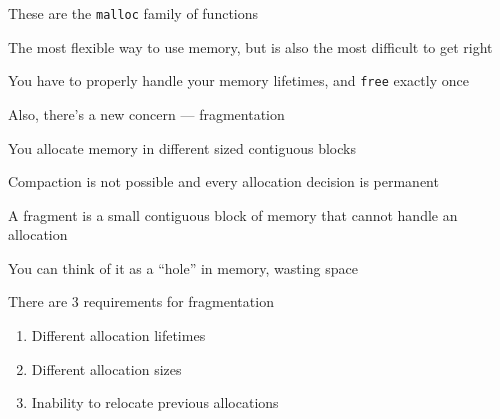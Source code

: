   \begin{slide}


    These are the \texttt{malloc} family of functions
    \medskip

    The most flexible way to use memory, but is also the most difficult to get
    right
    \medskip

    You have to properly handle your memory lifetimes, and \texttt{free}
    exactly once
    \medskip

    Also, there's a new concern --- fragmentation

  \end{slide}

  \begin{slide}


    You allocate memory in different sized contiguous blocks

    \leftspace{}Compaction is not possible and every allocation decision is
    permanent
    \medskip

    A fragment is a small contiguous block of memory that cannot handle an
    allocation

    \leftspace{}You can think of it as a ``hole'' in memory, wasting space
    \medskip

    There are 3 requirements for fragmentation
    \begin{enumerate}
        \item Different allocation lifetimes
        \item Different allocation sizes
        \item Inability to relocate previous allocations  
    \end{enumerate}

  \end{slide}

